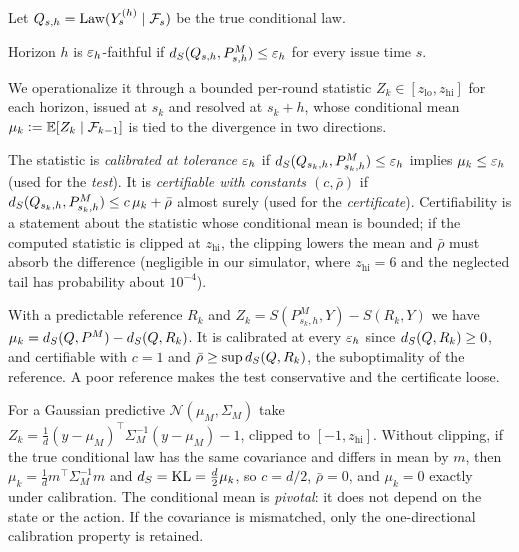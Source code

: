 Let $Q_{s,h}=\mathrm{Law}(Y^{(h)}_s\mid\mathcal{F}_s)$ be the true conditional law.

\begin{definition}\label{def:faithful}
Horizon $h$ is $\varepsilon_h$-faithful if $d_S(Q_{s,h},P^M_{s,h})\le\varepsilon_h$ for every issue time $s$.
\end{definition}

We operationalize it through a bounded per-round statistic $Z_k\in[z_{\mathrm{lo}},z_{\mathrm{hi}}]$
for each horizon, issued at $s_k$ and resolved at $s_k{+}h$, whose conditional mean $\mu_k\vcentcolon=
\mathbb{E}[Z_k\mid\mathcal{F}_{k-1}]$ is tied to the divergence in two directions.

\begin{definition}\label{def:cert}
The statistic is \emph{calibrated at tolerance $\varepsilon_h$} if
$d_S(Q_{s_k,h},P^M_{s_k,h})\le\varepsilon_h$ implies $\mu_k\le\varepsilon_h$ (used for the \emph{test}). It is
\emph{certifiable with constants $(c,\bar\rho)$} if $d_S(Q_{s_k,h},P^M_{s_k,h})\le c\,\mu_k+\bar\rho$ almost
surely (used for the \emph{certificate}). Certifiability is a statement about the statistic whose conditional mean is bounded; if the computed statistic is clipped at $z_{\mathrm{hi}}$, the clipping lowers the mean and $\bar\rho$ must absorb the difference (negligible in our simulator, where $z_{\mathrm{hi}}=6$ and the neglected tail has probability about $10^{-4}$).
\end{definition}

\begin{example}\label{ex:ref}
With a predictable reference $R_k$ and $Z_k=S(P^M_{s_k,h},Y)-S(R_k,Y)$ we have $\mu_k=d_S(Q,P^M)-d_S(Q,R_k)$.
It is calibrated at every $\varepsilon_h$ since $d_S(Q,R_k)\ge0$, and certifiable with $c=1$ and
$\bar\rho\ge\sup d_S(Q,R_k)$, the suboptimality of the reference. A poor reference makes the test
conservative and the certificate loose.
\end{example}

\begin{example}\label{ex:gauss}
For a Gaussian predictive $\mathcal N(\mu_M,\Sigma_M)$ take
$Z_k=\frac1d(y-\mu_M)^\top\Sigma_M^{-1}(y-\mu_M)-1$, clipped to $[-1,z_{\mathrm{hi}}]$. Without clipping, if the true
conditional law has the same covariance and differs in mean by $m$, then $\mu_k=\frac1d m^\top\Sigma_M^{-1}m$
and $d_S=\mathrm{KL}=\tfrac d2\mu_k$, so $c=d/2$, $\bar\rho=0$, and $\mu_k=0$ exactly under calibration.
The conditional mean is \emph{pivotal}: it does not depend on the state or the action. If the covariance
is mismatched, only the one-directional calibration property is retained.
\end{example}

